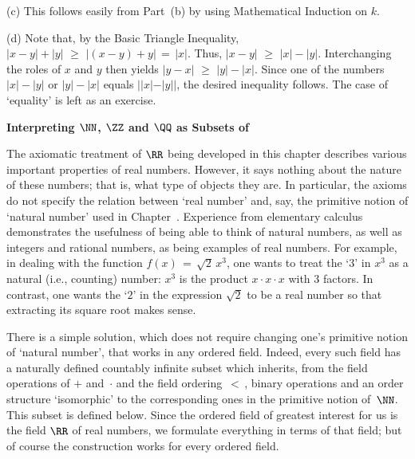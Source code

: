\V

        (c) This follows easily from Part~(b) by using Mathematical Induction on $k$.

\V

        (d) Note that, by the Basic Triangle Inequality, $|x-y|+|y|\,\,{\geq}\,\,|(x-y)+y| \,=\, |x|$.
    Thus, $|x-y|\,\,{\geq}\,\,|x|-|y|$. Interchanging the roles of $x$ and $y$ then yields $|y-x|\,\,{\geq}\,\,|y|-|x|$.
    Since one of the numbers $|x|-|y|$ or $|y|-|x|$ equals $||x|-|y||$, the desired inequality follows.
    The case of `equality' is left as an exercise.

\V


\VV

        {\bf Interpreting ${\NN}$, ${\ZZ}$ and ${\QQ}$ as Subsets of {\RR}}

\V

        The axiomatic treatment of ${\RR}$ being developed in this chapter describes various important properties of real numbers.
    However, it says nothing about the nature of these numbers; that is, what type of objects they are.
    In particular, the axioms do not specify the relation between `real number' and, say, the primitive notion of `natural number' used in Chapter~.
    Experience from elementary calculus demonstrates the usefulness of being able to think of natural numbers, as well as integers and rational numbers,
    as being examples of real numbers. For example, in dealing with the function $f(x) \,=\, \sqrt{2}\,x^{3}$,
    one wants to treat the `$3$' in $x^{3}$ as a natural (i.e., counting) number: $x^{3}$ is the product $x{\cdot}x{\cdot}x$ with $3$ factors.
    In contrast, one wants the `$2$' in the expression $\sqrt{2}$ to be a real number so that extracting its square root makes sense.

        There is a simple solution, which does not require changing one's  primitive notion of `natural number', that works in any ordered field.
    Indeed, every such field has a naturally defined countably infinite subset which inherits,
    from the field operations of $+$ and~${\cdot}$ and the field ordering $\,<\,$,
    binary operations and an order structure `isomorphic' to the corresponding ones in the primitive notion of~${\NN}$.
    This subset is defined below. Since the ordered field of greatest interest for us is the field ${\RR}$ of real numbers,
    we formulate everything in terms of that field; but of course the construction works for every ordered field.

